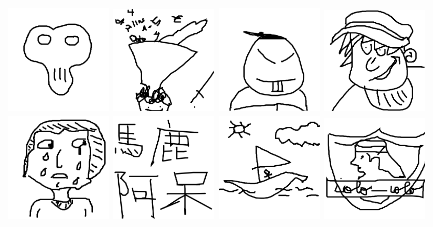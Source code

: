 \includegraphics[width=0.2\textwidth]{art/Safari_16.png}
\includegraphics[width=0.2\textwidth]{art/Safari_17.png}
\includegraphics[width=0.2\textwidth]{art/Safari_18.png}
\includegraphics[width=0.2\textwidth]{art/Safari_19.png}
\includegraphics[width=0.2\textwidth]{art/Safari_2.png}
\includegraphics[width=0.2\textwidth]{art/Safari_20.png}
\includegraphics[width=0.2\textwidth]{art/Safari_21.png}
\includegraphics[width=0.2\textwidth]{art/Safari_22.png}
